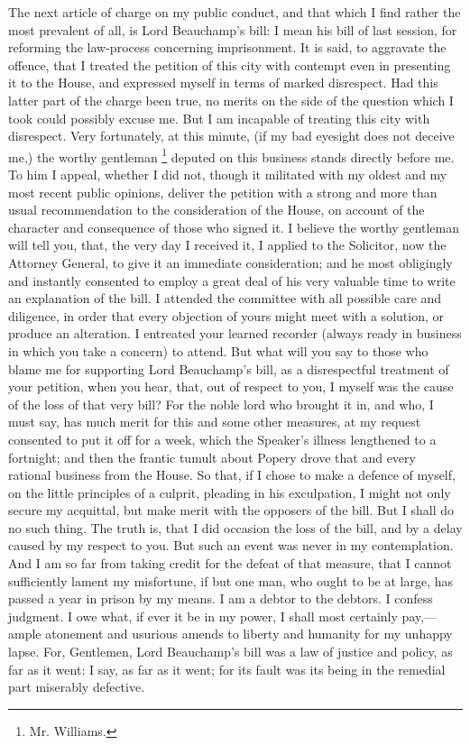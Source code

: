 The next article of charge on my public conduct, and that which I find rather the most prevalent of all, is Lord Beauchamp's bill: I mean his bill of last session, for reforming the law-process concerning imprisonment. It is said, to aggravate the offence, that I treated the petition of this city with contempt even in presenting it to the House, and expressed myself in terms of marked disrespect. Had this latter part of the charge been true, no merits on the side of the question which I took could possibly excuse me. But I am incapable of treating this city with disrespect. Very fortunately, at this minute, (if my bad eyesight does not deceive me,) the worthy gentleman 
\footnote{ Mr. Williams.}
 deputed on this business stands directly before me. To him I appeal, whether I did not, though it militated with my oldest and my most recent public opinions, deliver the petition with a strong and more than usual recommendation to the consideration of the House, on account of the character and consequence of those who signed it. I believe the worthy gentleman will tell you, that, the very day I received it, I applied to the Solicitor, now the Attorney General, to give it an immediate consideration; and he most obligingly and instantly consented to employ a great deal of his very valuable time to write an explanation of the bill. I attended the committee with all possible care and diligence, in order that every objection of yours might meet with a solution, or produce an alteration. I entreated your learned recorder (always ready in business in which you take a concern) to attend. But what will you say to those who blame me for supporting Lord Beauchamp's bill, as a disrespectful treatment of your petition, when you hear, that, out of respect to you, I myself was the cause of the loss of that very bill? For the noble lord who brought it in, and who, I must say, has much merit for this and some other measures, at my request consented to put it off for a week, which the Speaker's illness lengthened to a fortnight; and then the frantic tumult about Popery drove that and every rational business from the House. So that, if I chose to make a defence of myself, on the little principles of a culprit, pleading in his exculpation, I might not only secure my acquittal, but make merit with the opposers of the bill. But I shall do no such thing. The truth is, that I did occasion the loss of the bill, and by a delay caused by my respect to you. But such an event was never in my contemplation. And I am so far from taking credit for the defeat of that measure, that I cannot sufficiently lament my misfortune, if but one man, who ought to be at large, has passed a year in prison by my means. I am a debtor to the debtors. I confess judgment. I owe what, if ever it be in my power, I shall most certainly pay,—ample atonement and usurious amends to liberty and humanity for my unhappy lapse. For, Gentlemen, Lord Beauchamp's bill was a law of justice and policy, as far as it went: I say, as far as it went; for its fault was its being in the remedial part miserably defective.

